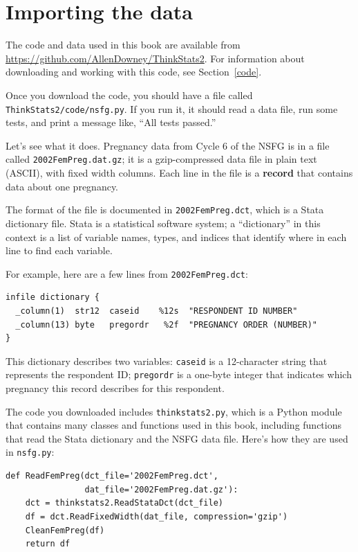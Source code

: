 \documentclass[12pt]{book}
\theoremstyle{exercise}
\begin{document}
\section{Importing the data}

The code and data used in this book are available from
\url{https://github.com/AllenDowney/ThinkStats2}.  For information
about downloading and working with this code, 
see Section~\ref{code}.

Once you download the code, you should have a file called {\tt
  ThinkStats2/code/nsfg.py}.  If you run it, it should read a data
file, run some tests, and print a message like, ``All tests passed.''

Let's see what it does.  Pregnancy data from Cycle 6 of the NSFG is in
a file called {\tt 2002FemPreg.dat.gz}; it
is a gzip-compressed data file in plain text (ASCII), with fixed width
columns.  Each line in the file is a {\bf record} that
contains data about one pregnancy.

The format of the file is documented in {\tt 2002FemPreg.dct}, which
is a Stata dictionary file.  Stata is a statistical software system;
a ``dictionary'' in this context is a list of variable names, types,
and indices that identify where in each line to find each variable.

For example, here are a few lines from {\tt 2002FemPreg.dct}:
%
\begin{verbatim}
infile dictionary {
  _column(1)  str12  caseid    %12s  "RESPONDENT ID NUMBER"
  _column(13) byte   pregordr   %2f  "PREGNANCY ORDER (NUMBER)"
}
\end{verbatim}

This dictionary describes two variables: {\tt caseid} is a 12-character
string that represents the respondent ID; {\tt pregordr} is a 
one-byte integer that indicates which pregnancy this record
describes for this respondent.

The code you downloaded includes {\tt thinkstats2.py}, which is a Python
module
that contains many classes and functions used in this book,
including functions that read the Stata dictionary and
the NSFG data file.  Here's how they are used in {\tt nsfg.py}:

\begin{verbatim}
def ReadFemPreg(dct_file='2002FemPreg.dct',
                dat_file='2002FemPreg.dat.gz'):
    dct = thinkstats2.ReadStataDct(dct_file)
    df = dct.ReadFixedWidth(dat_file, compression='gzip')
    CleanFemPreg(df)
    return df
\end{verbatim}
\end{document}

